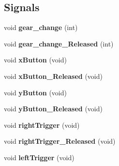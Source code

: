 \subsection*{Signals}
\begin{DoxyCompactItemize}
\item 
\hypertarget{class_remote_thread_a437bd94f9bac751befb6b7ef9dc8869f}{}void {\bfseries gear\+\_\+change} (int)\label{class_remote_thread_a437bd94f9bac751befb6b7ef9dc8869f}

\item 
\hypertarget{class_remote_thread_ab767be43aad824f123c7d0aaed84b428}{}void {\bfseries gear\+\_\+change\+\_\+\+Released} (int)\label{class_remote_thread_ab767be43aad824f123c7d0aaed84b428}

\item 
\hypertarget{class_remote_thread_acfd1278c3dea85ebbd51cd58311ca691}{}void {\bfseries x\+Button} (void)\label{class_remote_thread_acfd1278c3dea85ebbd51cd58311ca691}

\item 
\hypertarget{class_remote_thread_a004dcb4a95a7280027f766e482a1bc3d}{}void {\bfseries x\+Button\+\_\+\+Released} (void)\label{class_remote_thread_a004dcb4a95a7280027f766e482a1bc3d}

\item 
\hypertarget{class_remote_thread_a0d355904907c8f95abbde140e996f47c}{}void {\bfseries y\+Button} (void)\label{class_remote_thread_a0d355904907c8f95abbde140e996f47c}

\item 
\hypertarget{class_remote_thread_adc8c151dc217e4dd0ccdfc5673c0f851}{}void {\bfseries y\+Button\+\_\+\+Released} (void)\label{class_remote_thread_adc8c151dc217e4dd0ccdfc5673c0f851}

\item 
\hypertarget{class_remote_thread_a14dafcc79f78df3bd0dd31817ac7a322}{}void {\bfseries right\+Trigger} (void)\label{class_remote_thread_a14dafcc79f78df3bd0dd31817ac7a322}

\item 
\hypertarget{class_remote_thread_a6361b8e54d2dce24295f1c5d2d098579}{}void {\bfseries right\+Trigger\+\_\+\+Released} (void)\label{class_remote_thread_a6361b8e54d2dce24295f1c5d2d098579}

\item 
\hypertarget{class_remote_thread_abd8bcc507fcdcc4f523cfd740245be97}{}void {\bfseries left\+Trigger} (void)\label{class_remote_thread_abd8bcc507fcdcc4f523cfd740245be97}


\end{DoxyCompactItemize}
